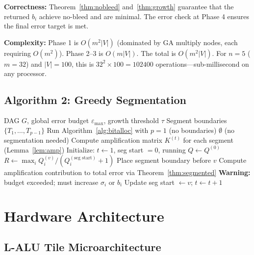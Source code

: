 \documentclass[11pt,a4paper]{article}
\theoremstyle{definition}
\theoremstyle{plain}
\theoremstyle{remark}
\begin{document}
\textbf{Correctness:} Theorem~\ref{thm:nobleed} and~\ref{thm:growth} guarantee that the returned $b_i$ achieve no-bleed and are minimal.  The error check at Phase 4 ensures the final error target is met.

\textbf{Complexity:}  Phase 1 is $O(m^2 |V|)$ (dominated by GA multiply nodes, each requiring $O(m^2)$).  Phase 2--3 is $O(m|V|)$.  The total is $O(m^2|V|)$.  For $n=5$ ($m=32$) and $|V|=100$, this is $32^2 \times 100 = 102400$ operations---sub-millisecond on any processor.

\subsection{Algorithm 2: Greedy Segmentation}

\begin{algorithm}[H]
\caption{Greedy Segmentation with Error Budget}
\label{alg:segment}
\begin{algorithmic}[1]
\REQUIRE DAG $G$, global error budget $\varepsilon_{\max}$, growth threshold $\tau$
\ENSURE Segment boundaries $\{T_1,\ldots,T_{p-1}\}$
\STATE Run Algorithm~\ref{alg:bitalloc} with $p=1$ (no boundaries)
 \RETURN $\emptyset$ (no segmentation needed) \ENDIF
\STATE Compute amplification matrix $K^{(t)}$ for each segment (Lemma~\ref{lem:amp})
\STATE Initialize: $t \leftarrow 1$, seg start $= 0$, running $Q \leftarrow Q^{(0)}$
  \STATE $R \leftarrow \max_i Q_i^{(v)} / (Q_i^{(\text{seg start})} + 1)$ 
    \STATE Place segment boundary before $v$
    \STATE Compute amplification contribution to total error via Theorem~\ref{thm:segmented}
      \STATE \textbf{Warning:} budget exceeded; must increase $\sigma_i$ or $b_i$
    \ENDIF
    \STATE Update seg start $\leftarrow v$; $t \leftarrow t+1$
  \ENDIF
\ENDFOR
\end{algorithmic}
\end{algorithm}

\section{Hardware Architecture}
\label{sec:hw}

\subsection{L-ALU Tile Microarchitecture}
\end{document}
